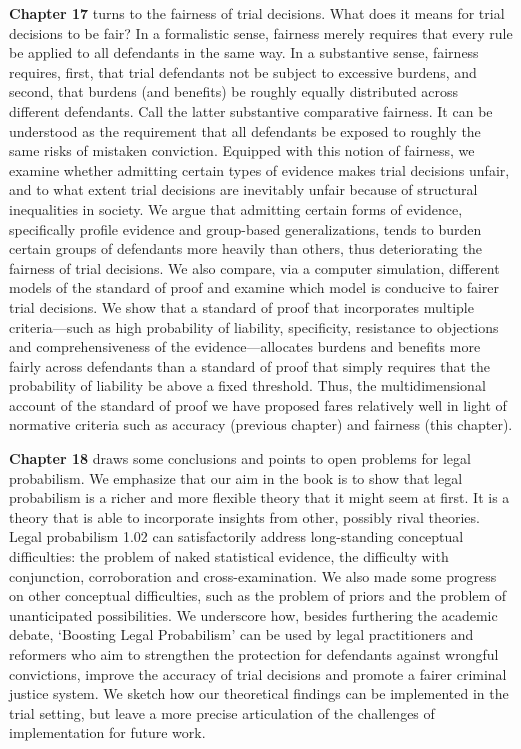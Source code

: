 \documentclass[
  10pt,
  dvipsnames,enabledeprecatedfontcommands]{scrartcl}
\begin{document}
\textbf{Chapter 17} turns to the fairness of trial decisions. What does
it means for trial decisions to be fair? In a formalistic sense,
fairness merely requires that every rule be applied to all defendants in
the same way. In a substantive sense, fairness requires, first, that
trial defendants not be subject to excessive burdens, and second, that
burdens (and benefits) be roughly equally distributed across different
defendants. Call the latter substantive comparative fairness. It can be
understood as the requirement that all defendants be exposed to roughly
the same risks of mistaken conviction. Equipped with this notion of
fairness, we examine whether admitting certain types of evidence makes
trial decisions unfair, and to what extent trial decisions are
inevitably unfair because of structural inequalities in society. We
argue that admitting certain forms of evidence, specifically profile
evidence and group-based generalizations, tends to burden certain groups
of defendants more heavily than others, thus deteriorating the fairness
of trial decisions. We also compare, via a computer simulation,
different models of the standard of proof and examine which model is
conducive to fairer trial decisions. We show that a standard of proof
that incorporates multiple criteria---such as high probability of
liability, specificity, resistance to objections and comprehensiveness
of the evidence---allocates burdens and benefits more fairly across
defendants than a standard of proof that simply requires that the
probability of liability be above a fixed threshold. Thus, the
multidimensional account of the standard of proof we have proposed fares
relatively well in light of normative criteria such as accuracy
(previous chapter) and fairness (this chapter).

\textbf{Chapter 18} draws some conclusions and points to open problems
for legal probabilism. We emphasize that our aim in the book is to show
that legal probabilism is a richer and more flexible theory that it
might seem at first. It is a theory that is able to incorporate insights
from other, possibly rival theories. Legal probabilism 1.02 can
satisfactorily address long-standing conceptual difficulties: the
problem of naked statistical evidence, the difficulty with conjunction,
corroboration and cross-examination. We also made some progress on other
conceptual difficulties, such as the problem of priors and the problem
of unanticipated possibilities. We underscore how, besides furthering
the academic debate, `Boosting Legal Probabilism' can be used by legal
practitioners and reformers who aim to strengthen the protection for
defendants against wrongful convictions, improve the accuracy of trial
decisions and promote a fairer criminal justice system. We sketch how
our theoretical findings can be implemented in the trial setting, but
leave a more precise articulation of the challenges of implementation
for future work.
\end{document}
